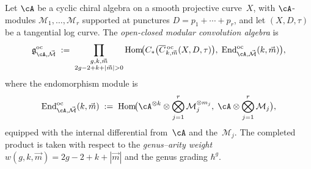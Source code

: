 \begin{definition}
\label{def:oc-modular-convolution}
Let $\cA$ be a cyclic chiral algebra on a smooth projective
curve~$X$, with $\cA$-modules
$\mathcal{M}_1, \ldots, \mathcal{M}_r$ supported at punctures
$D = p_1 + \cdots + p_r$, and let
$(X, D, \tau)$ be a tangential log curve.  The \emph{open-closed
modular convolution algebra} is
\begin{equation}\label{eq:oc-convolution}
\mathfrak{g}^{\mathrm{oc}}_{\cA, \vec{\mathcal{M}}}
\;:=\;
\prod_{\substack{g, k, \vec{m} \\ 2g - 2 + k + |\vec{m}| > 0}}
\operatorname{Hom}\!\bigl(
C_*\bigl(
\overline{C}{}^{\,\mathrm{oc}}_{k,\vec{m}}(X, D, \tau)
\bigr),\;
\operatorname{End}^{\mathrm{oc}}_{\cA, \vec{\mathcal{M}}}
(k, \vec{m})
\bigr),
\end{equation}
where the endomorphism module is
\begin{equation}\label{eq:oc-endomorphism}
\operatorname{End}^{\mathrm{oc}}_{\cA, \vec{\mathcal{M}}}
(k, \vec{m})
\;:=\;
\operatorname{Hom}\!\bigl(
\cA^{\otimes k}
\otimes
\bigotimes_{j=1}^{r} \mathcal{M}_j^{\otimes m_j},\;
\cA \otimes \bigotimes_{j=1}^r \mathcal{M}_j
\bigr),
\end{equation}
equipped with the internal differential from~$\cA$ and
the~$\mathcal{M}_j$.  The completed product is taken with respect
to the \emph{genus--arity weight}
$w(g, k, \vec{m}) = 2g - 2 + k + |\vec{m}|$
and the genus grading $\hbar^g$.
\end{definition}

